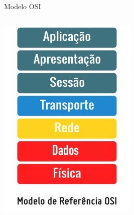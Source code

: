 \documentclass{libs/ufc_format}
\begin{document}
\begin{frame}{Modelo OSI}
    \begin{columns}
        \begin{column}{0.45\textwidth}
            \includegraphics[width=\textwidth, height=0.8\textheight]{media/osi.jpeg}
        \end{column}
        

\end{columns}
\end{frame}
\end{document}
